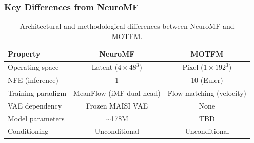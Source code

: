 \subsubsection{Key Differences from NeuroMF}

\begin{table}[ht]
\centering
\caption{Architectural and methodological differences between NeuroMF and MOTFM.}
\label{tab:neuromf_vs_motfm}
\begin{tabular}{lcc}
\toprule
\textbf{Property} & \textbf{NeuroMF} & \textbf{MOTFM} \\
\midrule
Operating space      & Latent ($4 \times 48^3$) & Pixel ($1 \times 192^3$) \\
NFE (inference)      & 1                        & 10 (Euler) \\
Training paradigm    & MeanFlow (iMF dual-head) & Flow matching (velocity) \\
VAE dependency       & Frozen MAISI VAE         & None \\
Model parameters     & ${\sim}$178M             & TBD \\
Conditioning         & Unconditional            & Unconditional \\
\bottomrule
\end{tabular}
\end{table}
